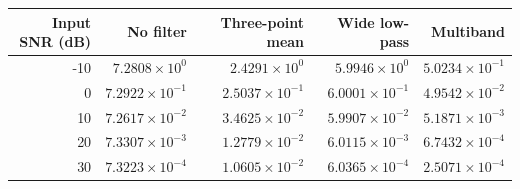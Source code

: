\begin{tabular}{rrrrr}
\toprule
Input SNR (dB) & No filter & Three-point mean & Wide low-pass & Multiband \\
\midrule
-10 & $7.2808\times10^{0}$ & $2.4291\times10^{0}$ & $5.9946\times10^{0}$ & $5.0234\times10^{-1}$ \\
0 & $7.2922\times10^{-1}$ & $2.5037\times10^{-1}$ & $6.0001\times10^{-1}$ & $4.9542\times10^{-2}$ \\
10 & $7.2617\times10^{-2}$ & $3.4625\times10^{-2}$ & $5.9907\times10^{-2}$ & $5.1871\times10^{-3}$ \\
20 & $7.3307\times10^{-3}$ & $1.2779\times10^{-2}$ & $6.0115\times10^{-3}$ & $6.7432\times10^{-4}$ \\
30 & $7.3223\times10^{-4}$ & $1.0605\times10^{-2}$ & $6.0365\times10^{-4}$ & $2.5071\times10^{-4}$ \\
\bottomrule
\end{tabular}
